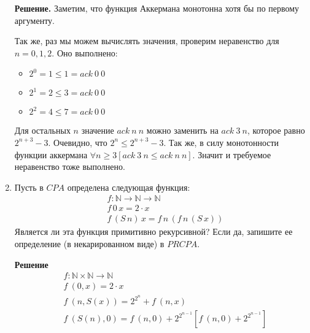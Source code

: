 \begin{enumerate}
\textbf{Решение.} Заметим, что функция Аккермана монотонна хотя бы по первому аргументу.

Так же, раз мы можем вычислять значения, проверим неравенство для $n = 0, 1, 2$. Оно выполнено:
\begin{itemize}
	\item $2^0 = 1 \le 1 = ack\ 0 \ 0$
	\item $2^1 = 2 \le 3 = ack\ 0 \ 0$
	\item $2^2 = 4 \le 7 = ack\ 0 \ 0$
\end{itemize}

Для остальных $n$ значение $ack \ n \ n$ можно заменить на $ack \ 3 \ n$, которое равно $2^{n + 3} - 3$. 
Очевидно, что $2^n \le 2^{n + 3} - 3$. Так же, в силу монотонности функции аккермана $\forall n \ge 3 \left[ 
ack \ 3 \ n \le ack \ n \ n \right] $. Значит и требуемое неравенство тоже выполнено.

\item Пусть в $CPA$ определена следующая функция:
\begin{align*}
& f : \mathbb{N} \to \mathbb{N} \to \mathbb{N} \\
& f\,0\,x = 2 \cdot x \\
& f\,(S\,n)\,x = f\,n\,(f\,n\,(S\,x))
\end{align*}
Является ли эта функция примитивно рекурсивной? Если да, запишите ее определение (в некарированном виде) в 
$PRCPA$.

\textbf{Решение}
\begin{align*}
& f : \mathbb{N} \times \mathbb{N} \to \mathbb{N} \\
& f \ (0,x) = 2 \cdot x \\
& f \ (n, S(x)) = 2 ^ {2 ^ n} + f \ (n, x) \\
& f \ (S(n), 0) = f \ (n, 0) + 2 ^ {2 ^ {n - 1}} \left[ f \ (n, 0) + 2 ^ {2 ^ {n - 1}}\right]
\end{align*}

\end{enumerate}
